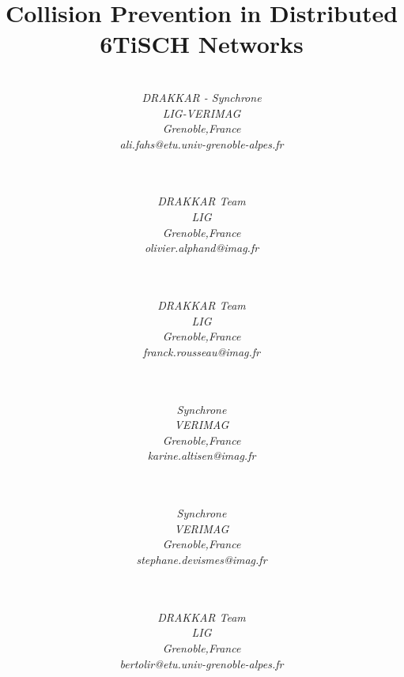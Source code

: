 \documentclass[10pt, conference, compsocconf]{IEEEtran}
\begin{document}
\title{Collision Prevention in Distributed 6TiSCH Networks }




\author
{
		\\ \textit{DRAKKAR - Synchrone} \\\textit{LIG-VERIMAG}\\ \textit{Grenoble,France} \\\textit{ali.fahs@etu.univ-grenoble-alpes.fr}\\\
\and 	{}\\ \textit{DRAKKAR Team} \\ \textit{LIG} \\\textit{Grenoble,France}\\\textit{olivier.alphand@imag.fr}\\\   
\and	{}\\ \textit{DRAKKAR Team} \\ \textit{LIG}\\\textit{Grenoble,France}\\\textit{franck.rousseau@imag.fr}\\\   
\and 	{}\\ \textit{Synchrone}\\ \textit{VERIMAG}\\\textit{Grenoble,France}\\\textit{karine.altisen@imag.fr}\\\
\and 	{}\\ \textit{Synchrone}\\ \textit{VERIMAG}\\ \textit{Grenoble,France} \\\textit{stephane.devismes@imag.fr}\\\
\and 	{}\\ \textit{DRAKKAR Team}\\ \textit{LIG}\\\textit{Grenoble,France}\\\textit{bertolir@etu.univ-grenoble-alpes.fr} \\\

}


\maketitle
\end{document}
